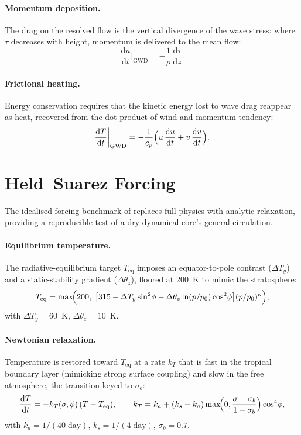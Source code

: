 \documentclass[11pt,twoside]{report}
\newcommand{\dd}{\mathrm{d}}
\newcommand{\cpd}{c_p}
\newcommand{\pref}{p_0}
\begin{document}
\paragraph{Momentum deposition.}
The drag on the resolved flow is the vertical divergence of the wave stress:
where $\tau$ decreases with height, momentum is delivered to the mean flow:
\begin{equation}
  \frac{\dd u}{\dd t}\bigg|_{\mathrm{GWD}} = -\frac{1}{\rho}\,
  \frac{\dd\tau}{\dd z}.
\end{equation}

\paragraph{Frictional heating.}
Energy conservation requires that the kinetic energy lost to wave drag reappear
as heat, recovered from the dot product of wind and momentum tendency:
\begin{equation}
  \frac{\dd T}{\dd t}\bigg|_{\mathrm{GWD}} =
  -\frac{1}{\cpd}\Bigl(u\,\frac{\dd u}{\dd t}+v\,\frac{\dd v}{\dd t}\Bigr).
\end{equation}


\section{Held--Suarez Forcing}
\label{sec:held-suarez}

The idealised forcing benchmark of \citet{HeldSuarez1994} replaces full
physics with analytic relaxation, providing a reproducible test of a dry
dynamical core's general circulation.

\paragraph{Equilibrium temperature.}
The radiative-equilibrium target $T_{\mathrm{eq}}$ imposes an equator-to-pole
contrast ($\Delta T_y$) and a static-stability gradient ($\Delta\theta_z$),
floored at $200$~K to mimic the stratosphere:
\begin{equation}
  T_{\mathrm{eq}} = \max\!\Bigl(200,\;
  \bigl[315-\Delta T_y\sin^2\!\phi
  - \Delta\theta_z\ln(p/\pref)\cos^2\!\phi\bigr]
  (p/\pref)^\kappa\Bigr),
\end{equation}
with $\Delta T_y=60$~K, $\Delta\theta_z=10$~K.

\paragraph{Newtonian relaxation.}
Temperature is restored toward $T_{\mathrm{eq}}$ at a rate $k_T$ that is fast
in the tropical boundary layer (mimicking strong surface coupling) and slow in
the free atmosphere, the transition keyed to $\sigma_b$:
\begin{equation}
  \frac{\dd T}{\dd t} = -k_T(\sigma,\phi)\,(T-T_{\mathrm{eq}}),
  \qquad
  k_T = k_a + (k_s-k_a)\max\!\Bigl(0,\frac{\sigma-\sigma_b}{1-\sigma_b}\Bigr)
  \cos^4\!\phi,
\end{equation}
with $k_a=1/(40\;\text{day})$, $k_s=1/(4\;\text{day})$, $\sigma_b=0.7$.
\end{document}
